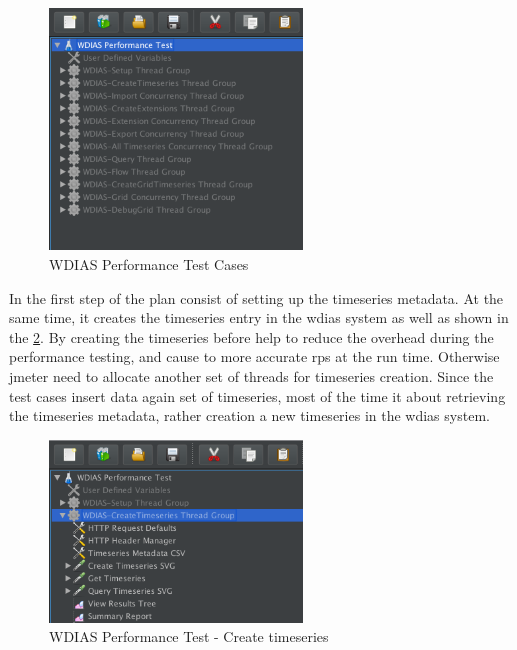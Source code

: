 \begin{figure}[htp]
    \centering
    \includegraphics[width=0.6\textwidth]{results/work_load/wdias_performance_test.png}
    \caption{WDIAS Performance Test Cases}
    \label{fi:wdias_performance_test}
\end{figure}


In the first step of the plan consist of setting up the timeseries metadata. At the same time, it creates the timeseries entry in the \acrshort{wdias} system as well as shown in the \ref{fi:test_create_timeseries}.
By creating the timeseries before help to reduce the overhead during the performance testing, and cause to more accurate \acrshort{rps} at the run time.
Otherwise \acrshort{jmeter} need to allocate another set of threads for timeseries creation. Since the test cases insert data again set of timeseries, most of the time it about retrieving the timeseries metadata, rather creation a new timeseries in the \acrshort{wdias} system.

\begin{figure}[htp]
    \centering
    \includegraphics[width=0.6\textwidth]{results/work_load/test_create_timeseries.png}
    \caption{WDIAS Performance Test - Create timeseries}
    \label{fi:test_create_timeseries}
\end{figure}

